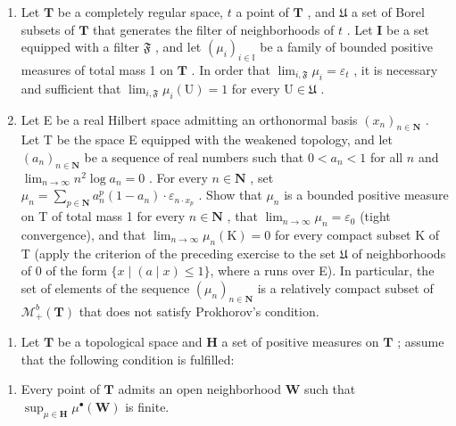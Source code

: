 \begin{enumerate}
\def\labelenumi{\arabic{enumi})}
\setcounter{enumi}{3}
\item
  Let \(\mathbf{T}\) be a completely regular space, \(t\) a point of \(\mathbf{T}\) , and \(\mathfrak{U}\) a set of Borel subsets of \(\mathbf{T}\) that generates the filter of neighborhoods of \(t\) . Let \(\mathbf{I}\) be a set equipped with a filter \(\mathfrak{F}\) , and let \((\mu_i)_{i \in \mathbb{I}}\) be a family of bounded positive measures of total mass 1 on \(\mathbf{T}\) . In order that \(\lim_{i, \mathfrak{F}} \mu_i = \varepsilon_t\) , it is necessary and sufficient that \(\lim_{i, \mathfrak{F}} \mu_i(\mathrm{U}) = 1\) for every \(\mathrm{U} \in \mathfrak{U}\) .
\item
  Let E be a real Hilbert space admitting an orthonormal basis \((x_{n})_{n\in \mathbf{N}}\) . Let T be the space E equipped with the weakened topology, and let \((a_{n})_{n\in \mathbf{N}}\) be a sequence of real numbers such that \(0 < a_{n} < 1\) for all \(n\) and \(\lim_{n\to \infty}n^2\log a_n = 0\) . For every \(n\in \mathbf{N}\) , set \(\mu_{n} = \sum_{p\in \mathbf{N}}a_{n}^{p}(1 - a_{n})\cdot \varepsilon_{n\cdot x_{p}}\) . Show that \(\mu_{n}\) is a bounded positive measure on T of total mass 1 for every \(n \in \mathbf{N}\) , that \(\lim_{n\to\infty}\mu_{n}=\varepsilon_{0}\) (tight convergence), and that \(\lim_{n\to\infty}\mu_{n}(\mathrm{K})=0\) for every compact subset \(\mathrm{K}\) of T (apply the criterion of the preceding exercise to the set \(\mathfrak{U}\) of neighborhoods of 0 of the form \(\{x \mid (a \mid x) \leqslant 1\}\), where a runs over E). In particular, the set of elements of the sequence \((\mu_{n})_{n \in \mathbf{N}}\) is a relatively compact subset of \(\mathcal{M}_{+}^{b}(\mathbf{T})\) that does not satisfy Prokhorov's condition.
\end{enumerate}


\begin{enumerate}
\def\labelenumi{\arabic{enumi})}
\setcounter{enumi}{5}
\tightlist
\item
  Let \(\mathbf{T}\) be a topological space and \(\mathbf{H}\) a set of positive measures on \(\mathbf{T}\) ; assume that the following condition is fulfilled:
\end{enumerate}

\begin{enumerate}
\def\labelenumi{(\Alph{enumi})}
\setcounter{enumi}{21}
\tightlist
\item
  Every point of \(\mathbf{T}\) admits an open neighborhood \(\mathbf{W}\) such that \(\sup_{\mu \in \mathbf{H}} \mu^{\bullet}(\mathbf{W})\) is finite.
\end{enumerate}


